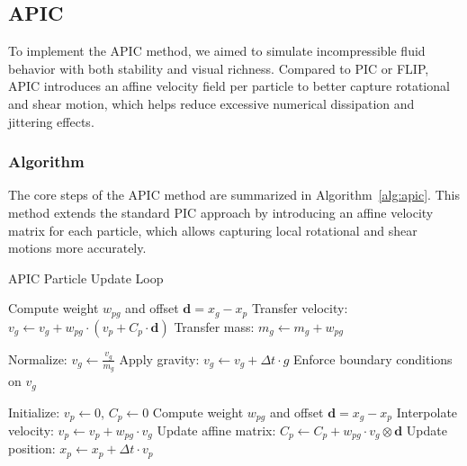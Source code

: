 \subsection{APIC}
To implement the APIC method, we aimed to simulate incompressible fluid behavior with both stability and visual richness. Compared to PIC or FLIP, APIC introduces an affine velocity field per particle to better capture rotational and shear motion, which helps reduce excessive numerical dissipation and jittering effects.

\subsubsection{Algorithm}

The core steps of the APIC method are summarized in Algorithm~\ref{alg:apic}. This method extends the standard PIC approach by introducing an affine velocity matrix for each particle, which allows capturing local rotational and shear motions more accurately.

\begin{algorithm}[h]
\caption{APIC Particle Update Loop}\label{alg:apic}
\begin{algorithmic}[1]

        \State Compute weight $w_{pg}$ and offset $\mathbf{d} = x_g - x_p$
        \State Transfer velocity: $v_g \gets v_g + w_{pg} \cdot (v_p + C_p \cdot \mathbf{d})$
        \State Transfer mass: $m_g \gets m_g + w_{pg}$
    \EndFor
\EndFor

        \State Normalize: $v_g \gets \frac{v_g}{m_g}$
    \EndIf
    \State Apply gravity: $v_g \gets v_g + \Delta t \cdot g$
    \State Enforce boundary conditions on $v_g$
\EndFor

    \State Initialize: $v_p \gets 0$, $C_p \gets 0$
        \State Compute weight $w_{pg}$ and offset $\mathbf{d} = x_g - x_p$
        \State Interpolate velocity: $v_p \gets v_p + w_{pg} \cdot v_g$
        \State Update affine matrix: $C_p \gets C_p + w_{pg} \cdot v_g \otimes \mathbf{d}$
    \EndFor
    \State Update position: $x_p \gets x_p + \Delta t \cdot v_p$
\EndFor
\end{algorithmic}
\end{algorithm}